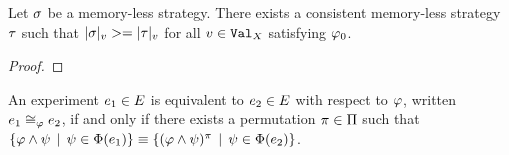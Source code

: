 \begin{lemma}
Let $\sigma$ be a memory-less strategy.
There exists a consistent memory-less strategy $\tau$ such that
  $|\sigma|_{v} >= |\tau|_{v}$
  for all $v\in\mathtt{Val}_X$ satisfying $\varphi_0$.
\end{lemma}

\begin{proof}

\end{proof}

\begin{definition}
An experiment $e_1\in E$ is equivalent to $e_2\in E$ with respect to $\varphi$,
  written $e_1\cong_{\varphi}e_2$,
  if and only if there exists a permutation $\pi\in\Pi$ such that
 $ \{ \varphi\wedge\psi \:\:|\:\: \psi\in\Phi(e_1) \} \equiv
   \{ (\varphi\wedge\psi)^\pi \:\:|\:\: \psi\in\Phi(e_2) \} $.
\end{definition}


